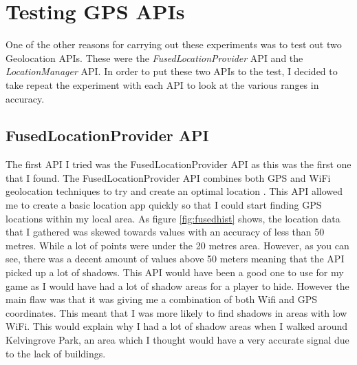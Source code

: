 \documentclass{l4proj}
\begin{document}
\section{Testing GPS APIs}
One of the other reasons for carrying out these experiments was to test out two Geolocation APIs. These
were the \emph{FusedLocationProvider} API and the \emph{LocationManager} API. In order to put these two
APIs to the test, I decided to take repeat the experiment with each API to look at the various ranges in
accuracy.

\subsection{FusedLocationProvider API}
\label{fusedProvider}
The first API I tried was the FusedLocationProvider API as this was the first one that I found. The FusedLocationProvider API combines both GPS and WiFi geolocation
techniques to try and create an optimal location \citep{fused}. This API allowed me to create a basic location app quickly so that I could start finding GPS locations
within my local area. As figure \ref{fig:fusedhist} shows, the location data that I gathered was skewed towards values with an accuracy of less than 50 metres. While a lot of
points were under the 20 metres area. However, as you can see, there was a decent amount of values above 50 meters meaning that the API picked up a lot of shadows.
This API would have been a good one to use for my game as I would have had a lot of shadow areas for a player to hide. However the main flaw was that
it was giving me a combination of both Wifi and GPS coordinates. This meant that I was more likely to find shadows in areas with low WiFi. This would
explain why I had a lot of shadow areas when I walked around Kelvingrove Park, an area which I thought would have a very accurate signal due to the lack of buildings.
\end{document}
